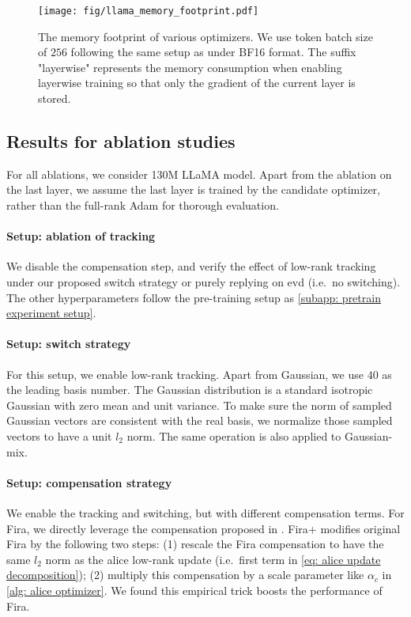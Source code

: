 \begin{figure}
    \centering
    \texttt{[image: fig/llama\_memory\_footprint.pdf]}
    \caption{The memory footprint of various optimizers. We use token batch size of $256$ following the same setup as \cite{zhao2024galore} under BF16 format. The suffix "layerwise" represents the memory consumption when enabling layerwise training so that only the gradient of the current layer is stored. }
    \label{fig:actual memory footprint}
\end{figure}

\subsection{Results for ablation studies}
\label{subapp: ablation results}
For all ablations, we consider 130M LLaMA model. Apart from the ablation on the last layer, we assume the last layer is trained by the candidate optimizer, rather than the full-rank Adam for thorough evaluation. 

\paragraph{Setup: ablation of tracking} We disable the compensation step, and verify the effect of low-rank tracking under our proposed switch strategy or purely replying on \gls{evd} (i.e.~no switching). The other hyperparameters follow the pre-training setup as \cref{subapp: pretrain experiment setup}. 

\paragraph{Setup: switch strategy}
For this setup, we enable low-rank tracking. Apart from Gaussian, we use $40$ as the leading basis number. The Gaussian distribution is a standard isotropic Gaussian with zero mean and unit variance. To make sure the norm of sampled Gaussian vectors are consistent with the real basis, we normalize those sampled vectors to have a unit $l_2$ norm. The same operation is also applied to Gaussian-mix. 

\paragraph{Setup: compensation strategy}
We enable the tracking and switching, but with different compensation terms. For Fira, we directly leverage the compensation proposed in \cite{chen2024fira}. Fira+ modifies original Fira by the following two steps: (1) rescale the Fira compensation to have the same $l_2$ norm as the \gls{alice} low-rank update (i.e.~first term in \cref{eq: alice update decomposition}); (2) multiply this compensation by a scale parameter like $\alpha_c$ in \cref{alg: alice optimizer}. We found this empirical trick boosts the performance of Fira. 


